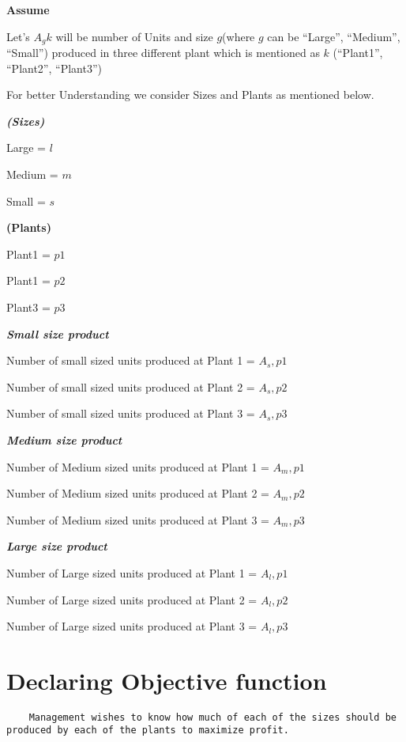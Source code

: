 \documentclass[
]{article}
\begin{document}
\textbf{Assume}

Let's \(A_gk\) will be number of Units and size \(g\)(where \(g\) can be
``Large'', ``Medium'', ``Small'') produced in three different plant
which is mentioned as \(k\) (``Plant1'', ``Plant2'', ``Plant3'')

For better Understanding we consider Sizes and Plants as mentioned
below.

\textbf{\emph{(Sizes)}}

Large = \(l\)

Medium = \(m\)

Small = \(s\)

\textbf{(Plants)}

Plant1 = \(p1\)

Plant1 = \(p2\)

Plant3 = \(p3\)

\textbf{\emph{Small size product}}

Number of small sized units produced at Plant 1 = \(A_s,p1\)

Number of small sized units produced at Plant 2 = \(A_s,p2\)

Number of small sized units produced at Plant 3 = \(A_s,p3\)

\textbf{\emph{Medium size product}}

Number of Medium sized units produced at Plant 1 = \(A_m,p1\)

Number of Medium sized units produced at Plant 2 = \(A_m,p2\)

Number of Medium sized units produced at Plant 3 = \(A_m,p3\)

\textbf{\emph{Large size product}}

Number of Large sized units produced at Plant 1 = \(A_l,p1\)

Number of Large sized units produced at Plant 2 = \(A_l,p2\)

Number of Large sized units produced at Plant 3 = \(A_l,p3\)

\hypertarget{declaring-objective-function-1}{%
\section{Declaring Objective
function}\label{declaring-objective-function-1}}

\begin{verbatim}
    Management wishes to know how much of each of the sizes should be produced by each of the plants to maximize profit.
    
\end{verbatim}
\end{document}
